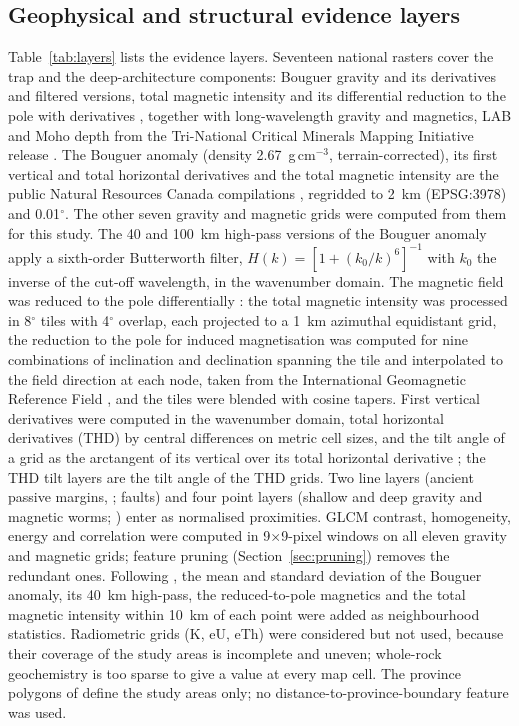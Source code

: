 \documentclass[pdflatex,sn-apa]{sn-jnl}
\begin{document}
\subsection{Geophysical and structural evidence layers}\label{sec:layers}

Table~\ref{tab:layers} lists the evidence layers. Seventeen national rasters cover the trap and the deep-architecture components: Bouguer gravity and its derivatives and filtered versions, total magnetic intensity and its differential reduction to the pole with derivatives \citep{Jobin2017,Miles2016}, together with long-wavelength gravity and magnetics, LAB and Moho depth from the Tri-National Critical Minerals Mapping Initiative release \citep{McCafferty2023}. The Bouguer anomaly (density 2.67~g\,cm$^{-3}$, terrain-corrected), its first vertical and total horizontal derivatives and the total magnetic intensity are the public Natural Resources Canada compilations \citep{Jobin2017,Miles2016}, regridded to 2~km (EPSG:3978) and 0.01$^\circ$. The other seven gravity and magnetic grids were computed from them for this study. The 40 and 100~km high-pass versions of the Bouguer anomaly apply a sixth-order Butterworth filter, $H(k) = [1 + (k_0/k)^6]^{-1}$ with $k_0$ the inverse of the cut-off wavelength, in the wavenumber domain. The magnetic field was reduced to the pole differentially \citep{ArkaniHamed1988,CooperCowan2005}: the total magnetic intensity was processed in 8$^\circ$ tiles with 4$^\circ$ overlap, each projected to a 1~km azimuthal equidistant grid, the reduction to the pole for induced magnetisation \citep{Blakely1995} was computed for nine combinations of inclination and declination spanning the tile and interpolated to the field direction at each node, taken from the International Geomagnetic Reference Field \citep[IGRF-13, epoch 2020.0;][]{Alken2021}, and the tiles were blended with cosine tapers. First vertical derivatives were computed in the wavenumber domain, total horizontal derivatives (THD) by central differences on metric cell sizes, and the tilt angle of a grid as the arctangent of its vertical over its total horizontal derivative \citep{Miller1994,Verduzco2004}; the THD tilt layers are the tilt angle of the THD grids. Two line layers (ancient passive margins, \citealp{BradleyDC2008}; faults) and four point layers (shallow and deep gravity and magnetic worms; \citealp{McCafferty2023}) enter as normalised proximities. GLCM contrast, homogeneity, energy and correlation were computed in 9$\times$9-pixel windows on all eleven gravity and magnetic grids; feature pruning (Section~\ref{sec:pruning}) removes the redundant ones. Following \citet{Luo2026}, the mean and standard deviation of the Bouguer anomaly, its 40~km high-pass, the reduced-to-pole magnetics and the total magnetic intensity within 10~km of each point were added as neighbourhood statistics. Radiometric grids (K, eU, eTh) were considered but not used, because their coverage of the study areas is incomplete and uneven; whole-rock geochemistry is too sparse to give a value at every map cell. The province polygons of \citet{Wheeler1996} define the study areas only; no distance-to-province-boundary feature was used.
\end{document}
